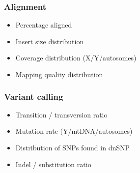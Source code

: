 \documentclass[slidestop,14pt]{beamer}
\begin{document}
{
  \frame{}
}

\begin{frame}
  \frametitle{Alignment}

  \vspace{\baselineskip}

  \begin{itemize}
    \item Percentage aligned
    \item Insert size distribution
    \item Coverage distribution (X/Y/autosomes)
    \item Mapping quality distribution
  \end{itemize}
\end{frame}

{
  \frame{}
}

\begin{frame}
  \frametitle{Variant calling}

  \vspace{\baselineskip}

  \begin{itemize}
    \item Transition / transversion ratio
    \item Mutation rate (Y/mtDNA/autosomes)
    \item Distribution of SNPs found in dnSNP
    \item Indel / substitution ratio
  \end{itemize}
\end{frame}
\end{document}
